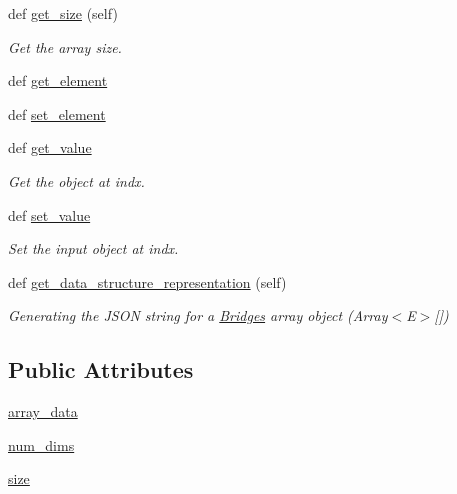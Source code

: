 \begin{DoxyCompactItemize}
def \hyperlink{class_bridges_1_1_array_1_1_array_a6b3843b3cd57ab072c7db1ca6c107d1d}{get\+\_\+size} (self)
\begin{DoxyCompactList}\small\item\em Get the array size. \end{DoxyCompactList}\item 
def \hyperlink{class_bridges_1_1_array_1_1_array_a945883030d9f57a98481f321ca2f3c2c}{get\+\_\+element}
\item 
def \hyperlink{class_bridges_1_1_array_1_1_array_a7a83c661c056fef855329a60f5904220}{set\+\_\+element}
\item 
def \hyperlink{class_bridges_1_1_array_1_1_array_a48228a7bf76d6e47da7bacdbd050a565}{get\+\_\+value}
\begin{DoxyCompactList}\small\item\em Get the object at \textquotesingle{}indx\textquotesingle{}. \end{DoxyCompactList}\item 
def \hyperlink{class_bridges_1_1_array_1_1_array_aa7b2b69b12fad62d21912b022b2640fe}{set\+\_\+value}
\begin{DoxyCompactList}\small\item\em Set the input object at \textquotesingle{}indx\textquotesingle{}. \end{DoxyCompactList}\item 
def \hyperlink{class_bridges_1_1_array_1_1_array_a2ff4613545bb6df7554b8f87fc7473fd}{get\+\_\+data\+\_\+structure\+\_\+representation} (self)
\begin{DoxyCompactList}\small\item\em Generating the J\+S\+O\+N string for a \hyperlink{namespace_bridges_1_1_bridges}{Bridges} array object (Array$<$\+E$>$\mbox{[}\mbox{]}) \end{DoxyCompactList}\end{DoxyCompactItemize}
\subsection*{Public Attributes}
\begin{DoxyCompactItemize}
\item 
\hyperlink{class_bridges_1_1_array_1_1_array_adad31f6bdd4c1c1fb95fab792d37455d}{array\+\_\+data}
\item 
\hyperlink{class_bridges_1_1_array_1_1_array_a61af14f906e3657866062bef69621445}{num\+\_\+dims}
\item 
\hyperlink{class_bridges_1_1_array_1_1_array_a63534e5d3bdcfbc18950ae0db5d7247c}{size}
\end{DoxyCompactItemize}

